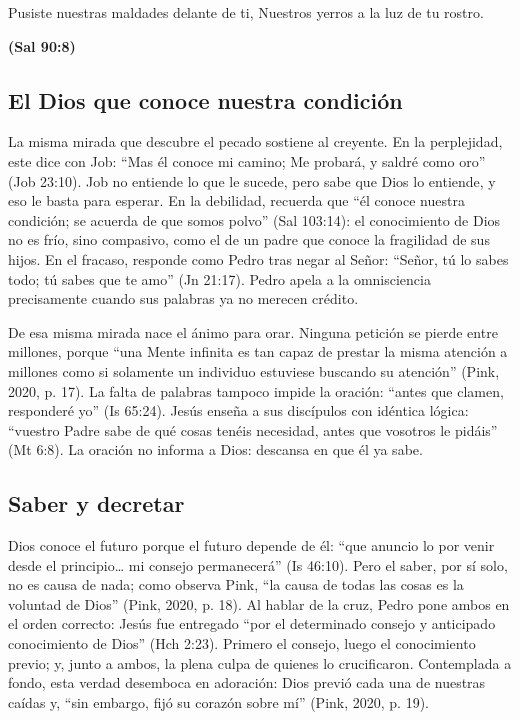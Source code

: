 \documentclass[11pt,letterpaper]{article}
\newcommand{\fuente}[1]{\par\hfill{\upshape\bfseries\small\textcolor{azul}{#1}}}
\begin{document}
\begin{cita}Pusiste nuestras maldades delante de ti, Nuestros yerros a la luz de tu rostro.\fuente{(Sal 90:8)}\end{cita}

\subsection{El Dios que conoce nuestra condición}
La misma mirada que descubre el pecado sostiene al creyente. En la perplejidad, este dice con Job: ``Mas él conoce mi camino; Me probará, y saldré como oro'' (Job 23:10). Job no entiende lo que le sucede, pero sabe que Dios lo entiende, y eso le basta para esperar. En la debilidad, recuerda que ``él conoce nuestra condición; se acuerda de que somos polvo'' (Sal 103:14): el conocimiento de Dios no es frío, sino compasivo, como el de un padre que conoce la fragilidad de sus hijos. En el fracaso, responde como Pedro tras negar al Señor: ``Señor, tú lo sabes todo; tú sabes que te amo'' (Jn 21:17). Pedro apela a la omnisciencia precisamente cuando sus palabras ya no merecen crédito.

De esa misma mirada nace el ánimo para orar. Ninguna petición se pierde entre millones, porque ``una Mente infinita es tan capaz de prestar la misma atención a millones como si solamente un individuo estuviese buscando su atención'' (Pink, 2020, p. 17). La falta de palabras tampoco impide la oración: ``antes que clamen, responderé yo'' (Is 65:24). Jesús enseña a sus discípulos con idéntica lógica: ``vuestro Padre sabe de qué cosas tenéis necesidad, antes que vosotros le pidáis'' (Mt 6:8). La oración no informa a Dios: descansa en que él ya sabe.

\subsection{Saber y decretar}
Dios conoce el futuro porque el futuro depende de él: ``que anuncio lo por venir desde el principio\ldots{} mi consejo permanecerá'' (Is 46:10). Pero el saber, por sí solo, no es causa de nada; como observa Pink, ``la causa de todas las cosas es la voluntad de Dios'' (Pink, 2020, p. 18). Al hablar de la cruz, Pedro pone ambos en el orden correcto: Jesús fue entregado ``por el determinado consejo y anticipado conocimiento de Dios'' (Hch 2:23). Primero el consejo, luego el conocimiento previo; y, junto a ambos, la plena culpa de quienes lo crucificaron. Contemplada a fondo, esta verdad desemboca en adoración: Dios previó cada una de nuestras caídas y, ``sin embargo, fijó su corazón sobre mí'' (Pink, 2020, p. 19).
\end{document}
